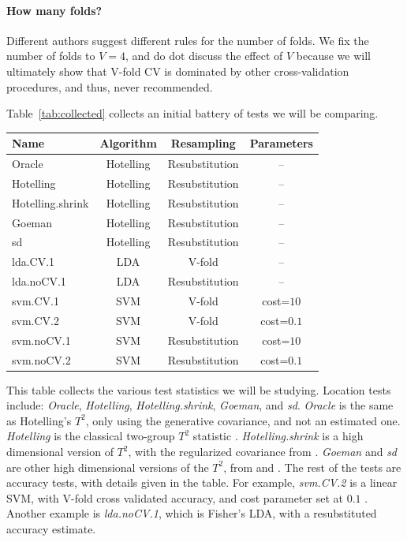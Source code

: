 \documentclass[journal]{IEEEtran}
\begin{document}
\paragraph{How many folds?}
Different authors suggest different rules for the number of folds. 
We fix the number of folds to $V=4$, and do dot discuss the effect of $V$ because we will ultimately show that V-fold CV is dominated by other cross-validation procedures, and thus, never recommended. 

\bigskip

Table~\ref{tab:collected} collects an initial battery of tests we will be comparing. 
\begin{tcolorbox}
	\centering
	\footnotesize
	\begin{tabular}{l|c|c|c}
		Name & Algorithm & Resampling & Parameters\\ 
		\hline
		\hline
		Oracle & Hotelling & Resubstitution & -- \\ 
		Hotelling & Hotelling & Resubstitution & -- \\ 
		Hotelling.shrink & Hotelling & Resubstitution & -- \\ 
		Goeman & Hotelling & Resubstitution & -- \\ 
		sd & Hotelling & Resubstitution & -- \\ 
		lda.CV.1 	& LDA & V-fold 			&  -- \\ 
		lda.noCV.1 	& LDA & Resubstitution 	&  --\\ 
		svm.CV.1 	& SVM & V-fold 		    & cost=$10$ \\ 
		svm.CV.2 	& SVM & V-fold 		    & cost=$0.1$ \\ 
		svm.noCV.1 	& SVM & Resubstitution  & cost=$10$ \\ 
		svm.noCV.2 	& SVM & Resubstitution  & cost=$0.1$ \\ 
	\end{tabular} 
	\captionsetup{type=table}
	\caption{\footnotesize
		This table collects the various test statistics we will be studying. 
		Location tests include: \textit{Oracle}, \textit{Hotelling}, \textit{Hotelling.shrink}, \textit{Goeman}, and \textit{sd}.
		\textit{Oracle} is the same as Hotelling's $T^2$, only using the generative covariance, and not an estimated one.
		\textit{Hotelling} is the classical two-group $T^2$ statistic \cite{anderson_introduction_2003}. 
		\textit{Hotelling.shrink} is a high dimensional version of $T^2$, with the regularized covariance from \cite{schafer_shrinkage_2005}. 
		\textit{Goeman} and \textit{sd} are other high dimensional versions of the $T^2$, from \cite{goeman2006testing} and \cite{srivastava_testing_2013}.
		The rest of the tests are accuracy tests, with details given in the table. 
		For example, \textit{svm.CV.2} is a linear SVM, with V-fold cross validated accuracy, and cost parameter set at $0.1$ \cite{meyer_e1071:_2015}.
		Another example is \textit{lda.noCV.1}, which is Fisher's LDA, with a resubstituted accuracy estimate.}
	\label{tab:collected}
\end{tcolorbox}
\end{document}
